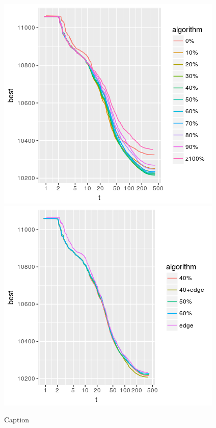 \documentclass[a4paper,12pt,bibtotoc,titlepage, liststotoc,BCOR7mm,headsepline,pointlessnumbers]{scrbook}
\numberwithin{equation}{section}
\begin{document}
\begin{figure}[t!] 
    \vspace*{-.25cm}
  \centering

   \includegraphics[width=.8\textwidth]{img/newip_tuning.png}
   \includegraphics[width=.8\textwidth]{img/edge frequency.png}

  \caption{Caption}
    \vspace*{-.5cm}
\end{figure}
\end{document}
